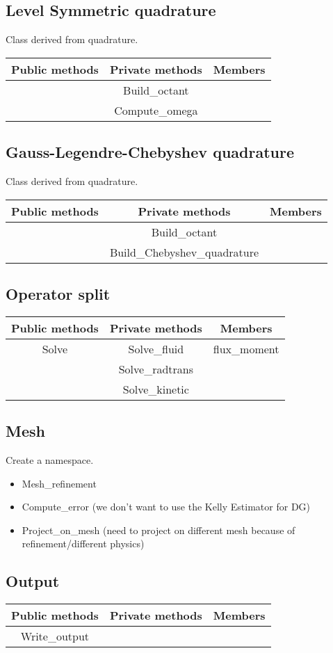 \subsection{Level Symmetric quadrature}
Class derived from quadrature.
\begin{table}[H]
  \centering
  \begin{tabular}{|c|c|c|}
    \hline
    Public methods & Private methods & Members \\
    \hline
    & Build\_octant  & \\
    & Compute\_omega & \\
    \hline
  \end{tabular}
\end{table}

\subsection{Gauss-Legendre-Chebyshev quadrature}
Class derived from quadrature.
\begin{table}[H]
  \centering
  \begin{tabular}{|c|c|c|}
    \hline
    Public methods & Private methods & Members \\
    \hline
    & Build\_octant & \\
    & Build\_Chebyshev\_quadrature & \\
    \hline
  \end{tabular}
\end{table} 

\subsection{Operator split}
\begin{table}[H]
  \centering
  \begin{tabular}{|c|c|c|}
    \hline
    Public methods & Private methods & Members \\
    \hline
    Solve & Solve\_fluid    & flux\_moment \\
          & Solve\_radtrans & \\
          & Solve\_kinetic  & \\
    \hline
  \end{tabular}
\end{table}

\subsection{Mesh}
Create a namespace.
\begin{itemize}
  \item Mesh\_refinement
  \item Compute\_error (we don't want to use the Kelly Estimator for DG)
  \item Project\_on\_mesh (need to project on different mesh because of
    refinement/different physics)
\end{itemize}

\subsection{Output}
\begin{table}[H]
  \centering
  \begin{tabular}{|c|c|c|}
    \hline
    Public methods & Private methods & Members \\
    \hline
    Write\_output & & \\
    \hline
  \end{tabular}
\end{table}
